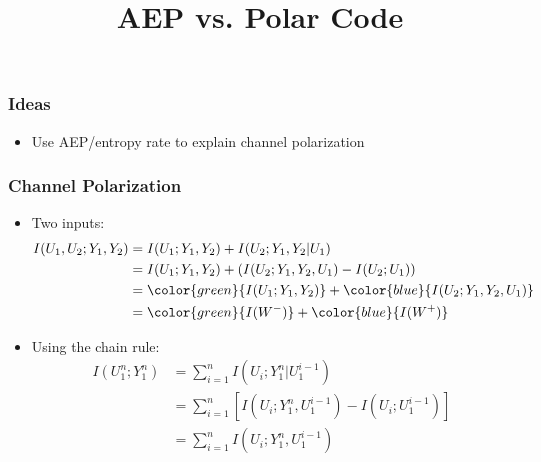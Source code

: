 \documentclass{beamer}
\title{AEP vs. Polar Code}
\begin{document}
\begin{frame}
\titlepage
\end{frame}

\begin{frame}
	\tableofcontents
\end{frame}



\begin{frame}
\frametitle{Ideas}
\begin{itemize}
\item Use AEP/entropy rate to explain channel polarization

\end{itemize}
\end{frame}

\begin{frame}
\frametitle{Channel Polarization}
\begin{itemize}
\item Two inputs:
\begin{align*}
I(U_1,U_2;Y_1,Y_2)
  &= I(U_1;Y_1,Y_2) + I(U_2;Y_1,Y_2|U_1) \\
  &= I(U_1;Y_1,Y_2) + \left( I(U_2;Y_1,Y_2,U_1) - I(U_2;U_1) \right) \\
  &= \color{green}{I(U_1;Y_1,Y_2)} + \color{blue}{I(U_2;Y_1,Y_2,U_1)} \\
  &= \color{green}{I(W^-)} + \color{blue}{I(W^+)}
\end{align*}

\item Using the chain rule:
\begin{align*}
I(U_1^n;Y_1^n)
  &= \sum_{i=1}^n I(U_i;Y_1^n|U_1^{i-1}) \\
  &= \sum_{i=1}^n \left[ I(U_i;Y_1^n,U_1^{i-1}) - I(U_i;U_1^{i-1}) \right] \\
  &= \sum_{i=1}^n I(U_i;Y_1^n,U_1^{i-1})
\end{align*}

\end{itemize}
\end{frame}

\end{document}

